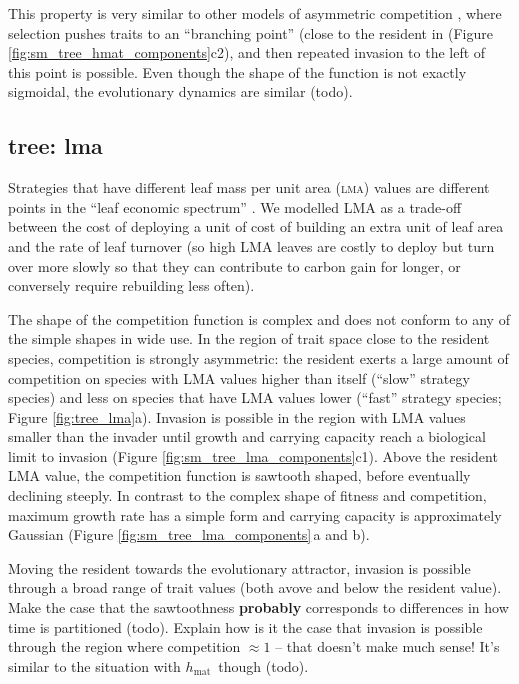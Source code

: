 \documentclass[a4paper,11pt]{article}
\newcommand{\TREE}{{\sc tree}}
\newcommand{\hmat}{\ensuremath{h_{\text{mat}}}}
\newcommand{\TODO}{{\color{red}\sc todo}}
\begin{document}
This property is very similar to other models of asymmetric
competition \citep[e.g.,][]{Kisdi-1999}, where selection pushes traits
to an ``branching point'' (close to the resident in (Figure
\ref{fig:sm_tree_hmat_components}c2), and then repeated invasion to
the left of this point is possible.
Even though the shape of the function is not exactly sigmoidal, the
evolutionary dynamics are similar (\TODO).

\subsection{\TREE: lma}
Strategies that have different leaf mass per unit area (\textsc{lma})
values are different points in the ``leaf economic spectrum''
\citep{Reich-1997,Wright-2004}.  We modelled LMA as a trade-off
between the cost of deploying a unit of cost of building an extra unit
of leaf area and the rate of leaf turnover (so high LMA leaves are
costly to deploy but turn over more slowly so that they can contribute
to carbon gain for longer, or conversely require rebuilding less
often).

The shape of the competition function is complex and does not conform
to any of the simple shapes in wide use.
In the region of trait space close to the resident species,
competition is strongly asymmetric: the resident exerts a large amount
of competition on species with LMA values higher than itself (``slow''
strategy species) and less on species that have LMA values lower
(``fast'' strategy species; Figure \ref{fig:tree_lma}a).  Invasion is
possible in the region with LMA values smaller than the invader until
growth and carrying capacity reach a biological limit to invasion
(Figure \ref{fig:sm_tree_lma_components}c1).
%
Above the resident LMA value, the competition function is sawtooth
shaped, before eventually declining steeply.
%
In contrast to the complex shape of fitness and competition, maximum
growth rate has a simple form and carrying capacity is approximately
Gaussian (Figure \ref{fig:sm_tree_lma_components}\,a and b).

Moving the resident towards the evolutionary attractor, invasion is
possible through a broad range of trait values (both avove and below
the resident value).
%
Make the case that the sawtoothness \textbf{probably} corresponds to
differences in how time is partitioned (\TODO).
%
Explain how is it the case that invasion is possible through the
region where competition $\approx 1$ -- that doesn't make much sense!
It's similar to the situation with \hmat\ though (\TODO).
\end{document}
